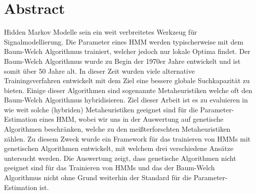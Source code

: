\chapter*{Abstract}
Hidden Markov Modelle sein ein weit verbreitetes Werkzeug für Signalmodellierung. Die Parameter eines HMM werden typischerweise mit dem Baum-Welch Algorithmus trainiert, welcher jedoch nur lokale Optima findet. Der Baum-Welch Algorithmus wurde zu Begin der 1970er Jahre entwickelt und ist somit über 50 Jahre alt. In dieser Zeit wurden viele alternative Trainingsverfahren entwickelt mit dem Ziel eine bessere globale Suchkapazität zu bieten. Einige dieser Algorithmen sind sogenannte Metaheuristiken welche oft den Baum-Welch Algorithmus hybridisieren. Ziel dieser Arbeit ist es zu evaluieren in wie weit solche (hybriden) Metaheuristiken geeignet sind für die Parameter-Estimation eines HMM, wobei wir uns in der Auswertung auf genetische Algorithmen beschränken, welche zu den meißterforschten Metaheuristiken zählen. Zu diesem Zweck wurde ein Framework für das trainieren von HMMs mit genetischen Algorithmen entwickelt, mit welchem drei verschiedene Ansätze untersucht werden. Die Auswertung zeigt, dass genetische Algorithmen nicht geeignet sind für das Trainieren von HMMs und das der Baum-Welch Algorithmus nicht ohne Grund weiterhin der Standard für die Parameter-Estimation ist.